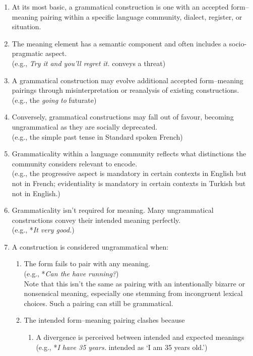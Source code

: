 \begin{enumerate}
    \item At its most basic, a grammatical construction is one with an accepted form--meaning pairing within a specific language community, dialect, register, or situation.
    \item The meaning element has a semantic component and often includes a socio-pragmatic aspect. \\(e.g., \textit{Try it and you'll regret it.} conveys a threat)
    \item A grammatical construction may evolve additional accepted form--meaning pairings through misinterpretation or reanalysis of existing constructions. \\(e.g., the \textit{going to} futurate)
    \item Conversely, grammatical constructions may fall out of favour, becoming ungrammatical as they are socially deprecated. \\(e.g., the simple past tense in Standard spoken French)
    \item Grammaticality within a language community reflects what distinctions the community considers relevant to encode.\\(e.g., the progressive aspect is mandatory in certain contexts in English but not in French; evidentiality is mandatory in certain contexts in Turkish but not in English.)
    \item Grammaticality isn't required for meaning. Many ungrammatical constructions convey their intended meaning perfectly. \\(e.g., *\textit{It very good.})
    \item A construction is considered ungrammatical when:
    \begin{enumerate}
        \item The form fails to pair with any meaning. \\(e.g., *\textit{Can the have running?})\\ Note that this isn't the same as pairing with an intentionally bizarre or nonsensical meaning, especially one stemming from incongruent lexical choices. Such a pairing can still be grammatical.
        \item The intended form--meaning pairing clashes because
        \begin{enumerate}
            \item A divergence is perceived between intended and expected meanings \\(e.g., *\textit{I have 35 years.} intended as `I am 35 years old.')

\end{enumerate}
\end{enumerate}
\end{enumerate}
